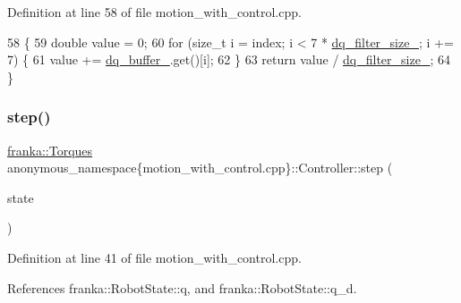 Definition at line 58 of file motion\+\_\+with\+\_\+control.\+cpp.


\begin{DoxyCode}
58                                            \{
59     \textcolor{keywordtype}{double} value = 0;
60     \textcolor{keywordflow}{for} (\textcolor{keywordtype}{size\_t} i = index; i < 7 * \hyperlink{classanonymous__namespace_02motion__with__control_8cpp_03_1_1Controller_aa8028a675125bc719556cb50e7736a8f}{dq\_filter\_size\_}; i += 7) \{
61       value += \hyperlink{classanonymous__namespace_02motion__with__control_8cpp_03_1_1Controller_a9c8092a809e69272e26dc32e7717b128}{dq\_buffer\_}.get()[i];
62     \}
63     \textcolor{keywordflow}{return} value / \hyperlink{classanonymous__namespace_02motion__with__control_8cpp_03_1_1Controller_aa8028a675125bc719556cb50e7736a8f}{dq\_filter\_size\_};
64   \}
\end{DoxyCode}
\mbox{\label{classanonymous__namespace_02motion__with__control_8cpp_03_1_1Controller_a33dd97681db88864c9897f050f5fd136}} 
\subsubsection{\texorpdfstring{step()}{step()}}
{\footnotesize\ttfamily \hyperlink{classfranka_1_1Torques}{franka\+::\+Torques} anonymous\+\_\+namespace\{motion\+\_\+with\+\_\+control.\+cpp\}\+::Controller\+::step (\begin{DoxyParamCaption}\item[{const \hyperlink{structfranka_1_1RobotState}{franka\+::\+Robot\+State} \&}]{state }\end{DoxyParamCaption})\hspace{0.3cm}{\ttfamily [inline]}}



Definition at line 41 of file motion\+\_\+with\+\_\+control.\+cpp.



References franka\+::\+Robot\+State\+::q, and franka\+::\+Robot\+State\+::q\+\_\+d.


